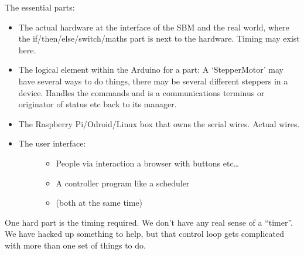 \documentclass[letterpaper,10pt,english,openany,oneside]{sphinxmanual}
\begin{document}
\sphinxAtStartPar
The essential parts:
\begin{itemize}
\item {} 
\sphinxAtStartPar
The actual hardware at the interface of the SBM and the real world,
where the if/then/else/switch/maths part is next to the
hardware. Timing may exist here.

\item {} 
\sphinxAtStartPar
The logical element within the Arduino for a part: A ‘StepperMotor’ may
have several ways to do things, there may be several different steppers
in a device. Handles the commands and is a communications terminus
or originator of status etc back to its manager.

\item {} 
\sphinxAtStartPar
The Raspberry Pi/Odroid/Linux box that owns the serial wires. Actual
wires.

\item {} \begin{description}
\item[{The user interface:}] \leavevmode\begin{itemize}
\item {} 
\sphinxAtStartPar
People via interaction a browser with buttons etc…

\item {} 
\sphinxAtStartPar
A controller program like a scheduler

\item {} 
\sphinxAtStartPar
(both at the same time)

\end{itemize}

\end{description}

\end{itemize}

\sphinxAtStartPar
One hard part is the timing required. We don’t have any real sense
of a “timer”. We have hacked up something to help, but that control
loop gets complicated with more than one set of things to do.
\end{document}
